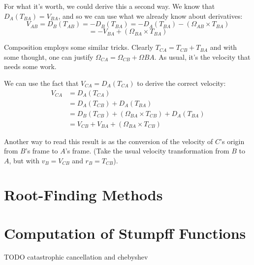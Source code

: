 \documentclass{article}
\numberwithin{equation}{subsection}
\begin{document}
For what it's worth, we could derive this a second way. We know that $D_A(T_{BA}) = V_{BA}$, and so we can use what we already know about derivatives:
\[ V_{AB} = D_B(T_{AB}) = -D_B(T_{BA}) = -D_A(T_{BA}) - (\Omega_{AB} \times T_{BA}) \]
\[ = -V_{BA} + (\Omega_{BA} \times T_{BA}) \]

Composition employs some similar tricks. Clearly $T_{CA} = T_{CB} + T_{BA}$ and with some thought, one can justify $\Omega_{CA} = \Omega_{CB} + \Omega{BA}$. As usual, it's the velocity that needs some work.

We can use the fact that $V_{CA} = D_A(T_{CA})$ to derive the correct velocity:
\begin{align*}
V_{CA} &= D_A(T_{CA}) \\
&= D_A(T_{CB}) + D_A(T_{BA}) \\
&= D_B(T_{CB}) + (\Omega_{BA} \times T_{CB}) + D_A(T_{BA}) \\
&= V_{CB} + V_{BA} + (\Omega_{BA} \times T_{CB})
\end{align*}

Another way to read this result is as the conversion of the velocity of $C$'s origin from $B$'s frame to $A$'s frame. (Take the usual velocity transformation from $B$ to $A$, but with $v_B = V_{CB}$ and $r_B = T_{CB}$).


\section{Root-Finding Methods}

\section{Computation of Stumpff Functions}

TODO catastrophic cancellation and chebyshev
\end{document}

